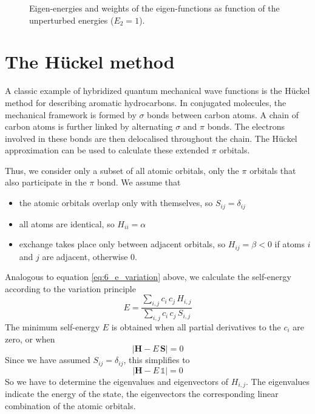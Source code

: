 \begin{figure}
\caption{Eigen-energies and weights of the eigen-functions as function of the unperturbed energies ($E_2 = 1$).}
\end{figure}








\section{The Hückel method}

A classic example of hybridized quantum mechanical wave functions is the Hückel method for describing aromatic hydrocarbons.
 In conjugated molecules, the mechanical framework is formed by $\sigma$ bonds between carbon atoms. A chain of carbon atoms is further linked by alternating $\sigma$ and $\pi$ bonds. The electrons involved in these bonds are then delocalised throughout the chain. The Hückel approximation can be used to calculate these extended $\pi$ orbitals.

Thus, we consider only a subset of all atomic orbitals, only the $\pi$ orbitals that also participate in the $\pi$ bond. We assume that
\begin{itemize} \setlength{\itemsep}{0pt}
\item the atomic orbitals overlap only with themselves, so $S_{ij} = \delta_{ij}$
\item all atoms are identical, so $H_{ii} = \alpha$
\item exchange takes place only between adjacent orbitals, so $H_{ij} = \beta < 0 $ if atoms $i$ and $j$ are adjacent, otherwise $0$. 
\end{itemize}

Analogous to equation \ref{eq:6_e_variation} above, we calculate the self-energy according to the variation principle
\begin{equation}
 E = \frac{ \sum_{i,j} c_i \, c_j \, H_{i,j} }{ \sum_{i,j} c_i \, c_j \, S_{i,j} }
\end{equation}
The minimum self-energy $E$ is obtained when all partial derivatives to the $c_i$ are zero, or when
\begin{equation}
 \left| \mathbf{H} - E \, \mathbf{S}\right| = 0
\end{equation}
Since we have assumed $S_{ij} = \delta_{ij}$, this simplifies to 
\begin{equation}
 \left| \mathbf{H} - E \, \mathds{1} \right| = 0
\end{equation}
So we have to determine the eigenvalues and eigenvectors of $H_{i,j}$. The eigenvalues indicate the energy of the state, the eigenvectors the corresponding linear combination of the atomic orbitals.


